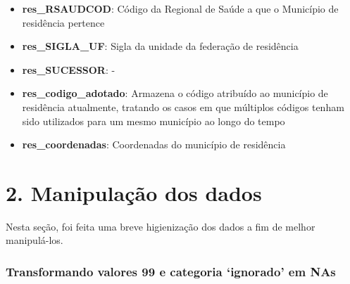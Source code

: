 \documentclass[
]{article}
\begin{document}
\begin{itemize}
\item
  \textbf{res\_RSAUDCOD}: Código da Regional de Saúde a que o Município
  de residência pertence
\item
  \textbf{res\_SIGLA\_UF}: Sigla da unidade da federação de residência
\item
  \textbf{res\_SUCESSOR}: -
\item
  \textbf{res\_codigo\_adotado}: Armazena o código atribuído ao
  município de residência atualmente, tratando os casos em que múltiplos
  códigos tenham sido utilizados para um mesmo município ao longo do
  tempo
\item
  \textbf{res\_coordenadas}: Coordenadas do município de residência
\end{itemize}

\newpage

\hypertarget{manipulauxe7uxe3o-dos-dados}{%
\section{2. Manipulação dos dados}\label{manipulauxe7uxe3o-dos-dados}}

Nesta seção, foi feita uma breve higienização dos dados a fim de melhor
manipulá-los.

\hypertarget{transformando-valores-99-e-categoria-ignorado-em-nas}{%
\subsubsection{Transformando valores 99 e categoria `ignorado' em
NAs}\label{transformando-valores-99-e-categoria-ignorado-em-nas}}
\end{document}

